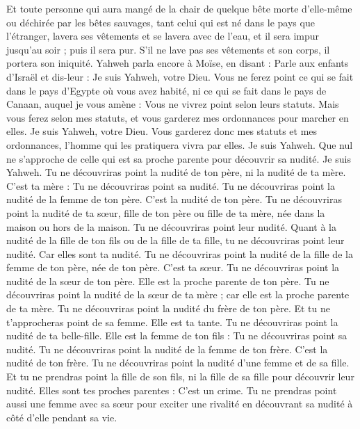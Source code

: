 \begin{multicols}{2}
Et toute personne qui aura mangé de la chair de quelque bête morte d'elle-même ou déchirée par les bêtes sauvages, tant celui qui est né dans le pays que l'étranger, lavera ses vêtements et se lavera avec de l'eau, et il sera impur jusqu'au soir ; puis il sera pur.
S'il ne lave pas ses vêtements et son corps, il portera son iniquité.
\VerseOne{}Yahweh parla encore à Moïse, en disant :
Parle aux enfants d'Israël et dis-leur : Je suis Yahweh, votre Dieu.
Vous ne ferez point ce qui se fait dans le pays d'Egypte où vous avez habité, ni ce qui se fait dans le pays de Canaan, auquel je vous amène : Vous ne vivrez point selon leurs statuts.
Mais vous ferez selon mes statuts, et vous garderez mes ordonnances pour marcher en elles. Je suis Yahweh, votre Dieu.
Vous garderez donc mes statuts et mes ordonnances, l'homme qui les pratiquera vivra par elles. Je suis Yahweh.
Que nul ne s'approche de celle qui est sa proche parente pour découvrir sa nudité. Je suis Yahweh.
Tu ne découvriras point la nudité de ton père, ni la nudité de ta mère. C'est ta mère : Tu ne découvriras point sa nudité.
Tu ne découvriras point la nudité de la femme de ton père. C'est la nudité de ton père.
Tu ne découvriras point la nudité de ta sœur, fille de ton père ou fille de ta mère, née dans la maison ou hors de la maison. Tu ne découvriras point leur nudité.
Quant à la nudité de la fille de ton fils ou de la fille de ta fille, tu ne découvriras point leur nudité. Car elles sont ta nudité.
Tu ne découvriras point la nudité de la fille de la femme de ton père, née de ton père. C'est ta sœur.
Tu ne découvriras point la nudité de la sœur de ton père. Elle est la proche parente de ton père.
Tu ne découvriras point la nudité de la sœur de ta mère ; car elle est la proche parente de ta mère.
Tu ne découvriras point la nudité du frère de ton père. Et tu ne t'approcheras point de sa femme. Elle est ta tante.
Tu ne découvriras point la nudité de ta belle-fille. Elle est la femme de ton fils : Tu ne découvriras point sa nudité.
Tu ne découvriras point la nudité de la femme de ton frère. C'est la nudité de ton frère.
Tu ne découvriras point la nudité d'une femme et de sa fille. Et tu ne prendras point la fille de son fils, ni la fille de sa fille pour découvrir leur nudité. Elles sont tes proches parentes : C'est un crime.
Tu ne prendras point aussi une femme avec sa sœur pour exciter une rivalité en découvrant sa nudité à côté d'elle pendant sa vie.

\end{multicols}
